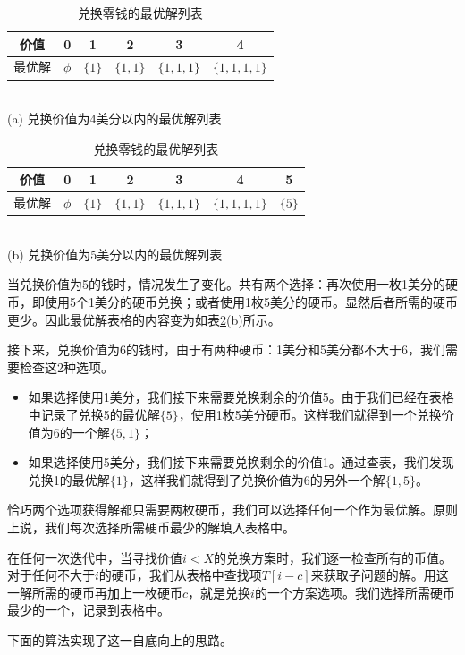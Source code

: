 \documentclass[b5paper]{ctexart}
\begin{document}
\begin{table}[htbp]
\centering
\begin{tabular}{c||c|c|c|c|c|}
\hline
价值 & 0 & 1 & 2 & 3 & 4 \\
\hline
最优解 & $\phi$ & $\{1\}$ & $\{1, 1\}$ & $\{1, 1, 1\}$ & $\{1, 1, 1, 1\}$ \\
\hline
\end{tabular} \\
(a) 兑换价值为4美分以内的最优解列表 \\
\vspace{10pt}
\begin{tabular}{c||c|c|c|c|c|c|}
\hline
价值 & 0 & 1 & 2 & 3 & 4 & 5 \\
\hline
最优解 & $\phi$ & $\{1\}$ & $\{1, 1\}$ & $\{1, 1, 1\}$ & $\{1, 1, 1, 1\}$ & $\{ 5 \}$ \\
\hline
\end{tabular} \\
(b) 兑换价值为5美分以内的最优解列表 \\
\caption{兑换零钱的最优解列表} \label{tab:change-money}
\end{table}

当兑换价值为5的钱时，情况发生了变化。共有两个选择：再次使用一枚1美分的硬币，即使用5个1美分的硬币兑换；或者使用1枚5美分的硬币。显然后者所需的硬币更少。因此最优解表格的内容变为如表\ref{tab:change-money}(b)所示。

接下来，兑换价值为6的钱时，由于有两种硬币：1美分和5美分都不大于6，我们需要检查这2种选项。

\begin{itemize}
\item 如果选择使用1美分，我们接下来需要兑换剩余的价值5。由于我们已经在表格中记录了兑换5的最优解$\{ 5 \}$，使用1枚5美分硬币。这样我们就得到一个兑换价值为6的一个解$\{5, 1\}$；
\item 如果选择使用5美分，我们接下来需要兑换剩余的价值1。通过查表，我们发现兑换1的最优解$\{ 1 \}$，这样我们就得到了兑换价值为6的另外一个解$\{1, 5\}$。
\end{itemize}

恰巧两个选项获得解都只需要两枚硬币，我们可以选择任何一个作为最优解。原则上说，我们每次选择所需硬币最少的解填入表格中。

在任何一次迭代中，当寻找价值$i < X$的兑换方案时，我们逐一检查所有的币值。对于任何不大于$i$的硬币，我们从表格中查找项$T[i-c]$来获取子问题的解。用这一解所需的硬币再加上一枚硬币$c$，就是兑换$i$的一个方案选项。我们选择所需硬币最少的一个，记录到表格中。

下面的算法实现了这一自底向上的思路。
\end{document}
